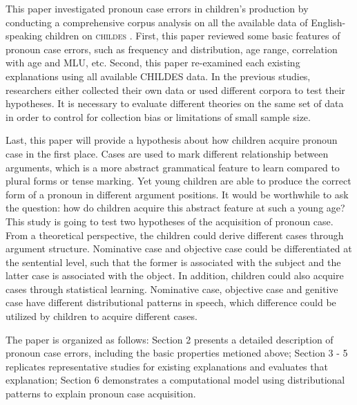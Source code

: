 This paper investigated pronoun case errors in children's production by conducting a comprehensive corpus analysis on all the available data of English-speaking children on \textsc{childes} \citep{macwhinney2014childes}. First, this paper reviewed some basic features of pronoun case errors, such as frequency and distribution, age range, correlation with age and MLU, etc. Second, this paper re-examined each existing explanations using all available CHILDES data. In the previous studies, researchers either collected their own data or used different corpora to test their hypotheses. It is necessary to evaluate different theories on the same set of data in order to control for collection bias or limitations of small sample size. 

Last, this paper will provide a hypothesis about how children acquire pronoun case in the first place. Cases are used to mark different relationship between arguments, which is a more abstract grammatical feature to learn compared to plural forms or tense marking. Yet young children are able to produce the correct form of a pronoun in different argument positions. It would be worthwhile to ask the question: how do children acquire this abstract feature at such a young age? This study is going to test two hypotheses of the acquisition of pronoun case. From a theoretical perspective, the children could derive different cases through argument structure. Nominative case and objective case could be differentiated at the sentential level, such that the former is associated with the subject and the latter case is associated with the object. In addition, children could also acquire cases through statistical learning. Nominative case, objective case and genitive case have different distributional patterns in speech, which difference could be utilized by children to acquire different cases. 

The paper is organized as follows: Section 2 presents a detailed description of pronoun case errors, including the basic properties metioned above; Section 3 - 5 replicates representative studies for existing explanations and evaluates that explanation; Section 6 demonstrates a computational model using distributional patterns to explain pronoun case acquisition.
